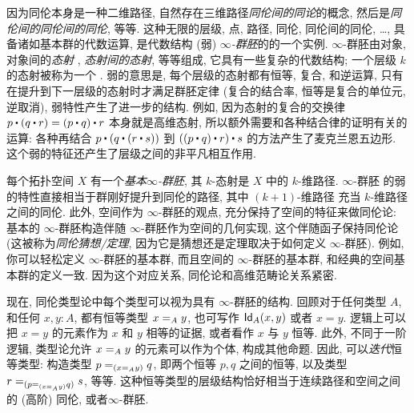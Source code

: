 因为同伦本身是一种二维路径, 自然存在三维路径\emph{同伦间的同论}的概念,
%
然后是\emph{同伦间的同伦间的同伦}, 等等.
这种无限的层级, 点, 路径, 同伦, 同伦间的同伦, \ldots, 具备诸如基本群的代数运算, 是代数结构 (弱) \emph{$\infty$-群胚}的的一个实例.
$\infty$-群胚由对象, 对象间的\emph{态射}%
, \emph{态射间的态射}, 等等组成, 它具有一些复杂的代数结构;
一个层级 $k$ 的态射被称为一个 .
弱的意思是, 每个层级的态射都有恒等, 复合, 和逆运算, 只有在提升到下一层级的态射时才满足群胚定律 (复合的结合率, 恒等是复合的单位元, 逆取消), 弱特性产生了进一步的结构.
例如, 因为态射的复合的交换律 $p \ct (q \ct r) = (p \ct q) \ct r$ 本身就是高维态射, 所以额外需要和各种结合律的证明有关的运算: 各种再结合 $p \ct (q \ct (r \ct s))$ 到 $((p \ct q) \ct r) \ct s$ 的方法产生了麦克兰恩五边形.
这个弱的特征还产生了层级之间的非平凡相互作用.

每个拓扑空间 $X$ 有一个\emph{基本$\infty$-群胚},
%
%
其 $k$-态射是 $X$ 中的 $k$-维路径.
$\infty$-群胚 的弱的特性直接相当于群刚好提升到同伦的路径, 其中 $(k+1)$-维路径 充当 $k$-维路径之间的同伦.
此外, 空间作为 $\infty$-群胚的观点, 充分保持了空间的特征来做同伦论: 基本的 $\infty$-群胚构造伴随 $\infty$-群胚作为空间的几何实现, 这个伴随函子保持同伦论
(这被称为\emph{同伦猜想/定理}, 
%
因为它是猜想还是定理取决于如何定义 $\infty$-群胚).
例如, 你可以轻松定义 $\infty$-群胚的基本群, 而且空间的 $\infty$-群胚的基本群, 和经典的空间基本群的定义一致.
因为这个对应关系, 同伦论和高维范畴论关系紧密.

%
%

\mentalpause

现在, 同伦类型论中每个类型可以视为具有 $\infty$-群胚的结构.
回顾对于任何类型 $A$, 和任何 $x,y:A$, 都有恒等类型 $\id[A]{x}{y}$, 也可写作 $\idtype[A]{x}{y}$ 或者 $x=y$.
逻辑上可以把 $x=y$ 的元素作为 $x$ 和 $y$ 相等的证据, 或者看作 $x$ 与 $y$ 恒等. 此外, 不同于一阶逻辑, 类型论允许 $\id[A]{x}{y}$ 的元素可以作为个体, 构成其他命题.
因此, 可以\emph{迭代}恒等类型: 构造类型
$\id[{(\id[A]{x}{y})}]{p}{q}$, 即两个恒等 $p,q$ 之间的恒等, 以及类型 $\id[{(\id[{(\id[A]{x}{y})}]{p}{q})}]{r}{s}$, 等等.
这种恒等类型的层级结构恰好相当于连续路径和空间之间的 (高阶) 同伦, 或者$\infty$-群胚.


